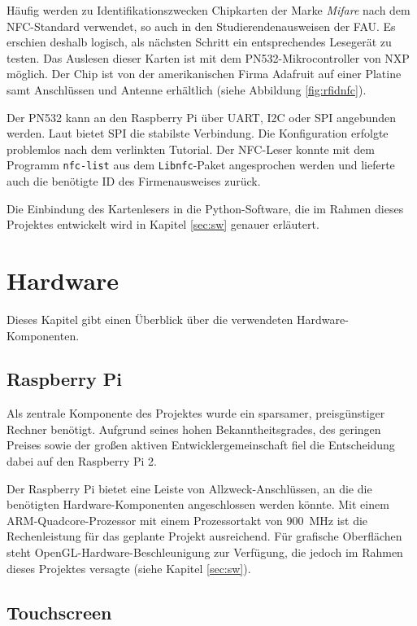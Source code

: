 \documentclass[11pt,a4paper]{IEEEtran}
\begin{document}
Häufig werden zu Identifikationszwecken Chipkarten der Marke \emph{Mifare} nach
dem NFC-Standard verwendet, so auch in den Studierendenausweisen der
FAU\autocite{FauCARD}. Es erschien deshalb logisch, als nächsten Schritt ein
entsprechendes Lesegerät zu testen. Das Auslesen dieser Karten ist mit dem
PN532-Mikrocontroller von NXP möglich. Der Chip ist von der amerikanischen
Firma Adafruit\autocite{AdafruitHP} auf einer Platine samt Anschlüssen und
Antenne erhältlich (siehe Abbildung \ref{fig:rfidnfc}).

Der PN532 kann an den Raspberry Pi über UART, I2C oder SPI angebunden werden.
Laut \autocite{PN532Tutorial} bietet SPI die stabilste Verbindung. Die
Konfiguration erfolgte problemlos nach dem verlinkten Tutorial. Der NFC-Leser
konnte mit dem Programm \texttt{nfc-list} aus dem \texttt{Libnfc}-Paket 
angesprochen werden und lieferte auch die benötigte ID des Firmenausweises
zurück.

Die Einbindung des Kartenlesers in die Python-Software, die im Rahmen dieses 
Projektes entwickelt wird in Kapitel \ref{sec:sw} genauer erläutert.

\section{Hardware} \label{sec:hw}

Dieses Kapitel gibt einen Überblick über die verwendeten Hardware-Komponenten.

\subsection{Raspberry Pi}

Als zentrale Komponente des Projektes wurde ein sparsamer, preisgünstiger
Rechner benötigt. Aufgrund seines hohen Bekanntheitsgrades, des geringen Preises 
sowie der großen aktiven Entwicklergemeinschaft fiel die Entscheidung dabei
auf den Raspberry Pi 2. 

Der Raspberry Pi bietet eine Leiste von Allzweck-Anschlüssen, an die die
benötigten Hardware-Komponenten angeschlossen werden könnte. Mit einem
ARM-Quadcore-Prozessor mit einem Prozessortakt von \SI{900}{\mega\hertz} ist
die Rechenleistung für das geplante Projekt ausreichend. Für grafische
Oberflächen steht OpenGL-Hardware-Beschleunigung zur Verfügung, die jedoch im 
Rahmen dieses Projektes versagte (siehe Kapitel \ref{sec:sw}).

\subsection{Touchscreen}
\end{document}
